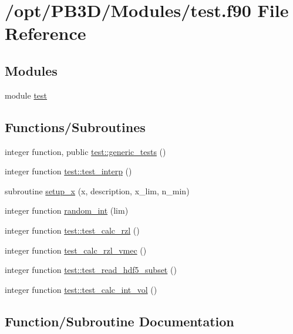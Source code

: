 \hypertarget{test_8f90}{}\section{/opt/\+P\+B3\+D/\+Modules/test.f90 File Reference}
\label{test_8f90}
\subsection*{Modules}
\begin{DoxyCompactItemize}
\item 
module \hyperlink{namespacetest}{test}
\end{DoxyCompactItemize}
\subsection*{Functions/\+Subroutines}
\begin{DoxyCompactItemize}
\item 
integer function, public \hyperlink{namespacetest_aca21ee464c0b1f4b617177afdde110ec}{test\+::generic\+\_\+tests} ()
\item 
integer function \hyperlink{namespacetest_af72aaa5773b5bef2ac8d25fd05378439}{test\+::test\+\_\+interp} ()
\item 
subroutine \hyperlink{test_8f90_ac59a32c8a4039263eb65c3990732d878}{setup\+\_\+x} (x, description, x\+\_\+lim, n\+\_\+min)
\item 
integer function \hyperlink{test_8f90_a2da760282029987928d286425c000648}{random\+\_\+int} (lim)
\item 
integer function \hyperlink{namespacetest_a4a25e64af6b986091f9e49ba447fc5c4}{test\+::test\+\_\+calc\+\_\+rzl} ()
\item 
integer function \hyperlink{test_8f90_aeb10d95d96ba86499fee37a84048e43c}{test\+\_\+calc\+\_\+rzl\+\_\+vmec} ()
\item 
integer function \hyperlink{namespacetest_ac574f08ba400cd61070a6a6f13f6f7ee}{test\+::test\+\_\+read\+\_\+hdf5\+\_\+subset} ()
\item 
integer function \hyperlink{namespacetest_a0d4cb791bf762b2e52260fea7644a3ee}{test\+::test\+\_\+calc\+\_\+int\+\_\+vol} ()
\end{DoxyCompactItemize}


\subsection{Function/\+Subroutine Documentation}
\mbox{\label{test_8f90_a2da760282029987928d286425c000648}} 
